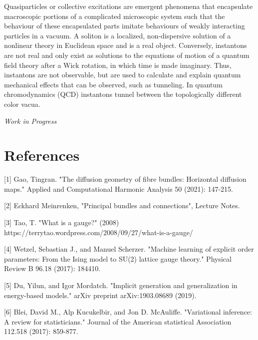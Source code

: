\documentclass{article}
\begin{document}
    Quasiparticles or collective excitations are emergent phenomena that encapsulate macroscopic portions of a complicated microscopic system such that the behaviour of these encapsulated parts imitate  behaviours of weakly interacting particles in a vacuum. 
    A soliton is a localized, non-dispersive solution of a nonlinear theory in Euclidean space and is a real object. Conversely, instantons are not real and only exist as solutions to the equations of motion of a quantum field theory after a Wick rotation, in which time is made imaginary. Thus, instantons are not observable, but are used to calculate and explain quantum mechanical effects that can be observed, such as tunneling. In quantum chromodynamics (QCD) instantons tunnel between the topologically different color vacua.
    
\textit{Work in Progress}


\section*{References}

\small

[1] Gao, Tingran. "The diffusion geometry of fibre bundles: Horizontal diffusion maps." Applied and Computational Harmonic Analysis 50 (2021): 147-215.

[2] Eckhard Meinrenken, "Principal bundles and connections", Lecture Notes. 

[3] Tao, T. "What is a gauge?" (2008) https://terrytao.wordpress.com/2008/09/27/what-is-a-gauge/

[4] Wetzel, Sebastian J., and Manuel Scherzer. "Machine learning of explicit order parameters: From the Ising model to SU(2) lattice gauge theory." Physical Review B 96.18 (2017): 184410.


[5] Du, Yilun, and Igor Mordatch. "Implicit generation and generalization in energy-based models." arXiv preprint arXiv:1903.08689 (2019).

[6] Blei, David M., Alp Kucukelbir, and Jon D. McAuliffe. "Variational inference: A review for statisticians." Journal of the American statistical Association 112.518 (2017): 859-877.

\end{document}

